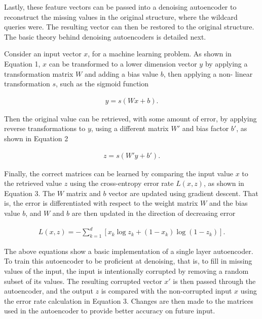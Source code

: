 \documentclass{sig-alternate}
\begin{document}
Lastly, these feature vectors can be passed into a denoising autoencoder to reconstruct the missing values
in the original structure, where the wildcard queries were. The resulting vector can then be restored
to the original structure. The basic theory behind denoising autoencoders is detailed next.

Consider an input vector $x$, for a machine learning problem.
As shown in Equation 1, $x$ can be transformed to a lower dimension
vector $y$ by applying a transformation matrix $W$ and adding a bias value $b$, then applying a non-
linear transformation $s$, such as the sigmoid function

\begin{gather}
y = s(Wx + b).
\end{gather}

Then the original value can be retrieved, with some amount of error, by applying reverse transformations to $y$,
using a different matrix $W'$ and bias factor $b'$, as shown in Equation 2

\begin{gather}
z = s(W' y  + b').
\end{gather}

Finally, the correct matrices can be learned by comparing the input value $x$ to the retrieved value $z$ 
using the cross-entropy error rate $L(x,z)$, as shown in Equation 3. The $W$ matrix and $b$ vector
are updated using gradient descent. That is, the error is differentiated
with respect to the weight matrix $W$ and the bias value $b$, and $W$ and $b$ are then updated in the
direction of decreasing error

\begin{gather}
L(x,z) = -\sum_{k=1}^d [x_k \log z_k + (1-x_k) \log(1-z_k)].
\end{gather}

The above equations show a basic implementation of a single layer autoencoder. To train this
autoencoder to be proficient at denoising, that is, to fill in missing values of the input, the input
is intentionally corrupted by removing a random subset of its values. The resulting corrupted
vector $x'$ is then passed through the autoencoder, and the output $z$ is compared with the
non-corrupted input $x$ using the error rate calculation in Equation 3. Changes are then made
to the matrices used in the autoencoder to provide better accuracy on future input.

\end{document}
